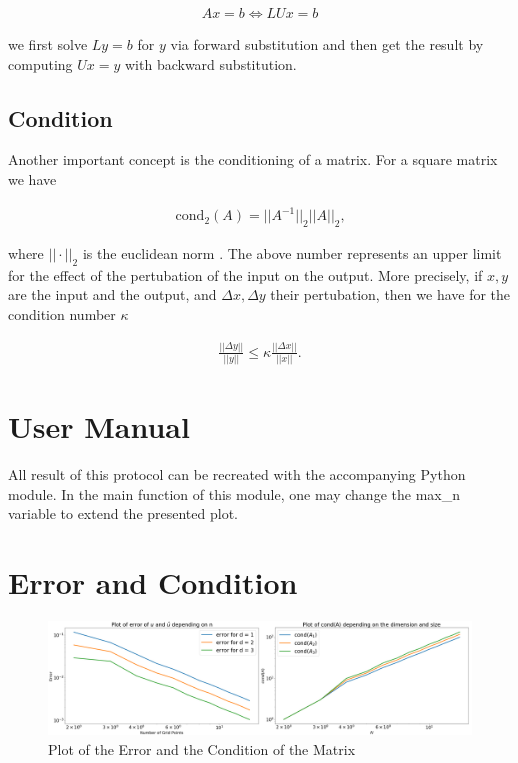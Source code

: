 \documentclass[refman]{article}
\theoremstyle{definition}
\begin{document}
\begin{align*}
	Ax = b \iff LUx = b
\end{align*}

we first solve \(Ly = b\) for \(y\) via forward substitution and then get the result by computing \(Ux = y\) with backward substitution.

\subsection{Condition}

Another important concept is the conditioning of a matrix. For a square matrix we have

\begin{align*}
	\text{cond}_2(A) = ||A^{-1}||_2 ||A||_2 \text{,}
\end{align*}

where \(|| \cdot ||_2\) is the euclidean norm \cite{nla}. The above number represents an upper limit for the effect of the pertubation of the input on the output. More precisely, if \(x, y\) are the input and the output, and \(\Delta x, \Delta y\) their pertubation, then we have for the condition number \(\kappa\)

\begin{align*}
	\frac{||\Delta y||}{||y||} \leq \kappa \frac{||\Delta x||}{||x||} \text{.}
\end{align*}

\section{User Manual}

All result of this protocol can be recreated with the accompanying Python module. In the main function of this module, one may change the max\_n variable to extend the presented plot.

\section{Error and Condition}

\begin{figure}[h]
	\includegraphics[width=\linewidth]{graphics/error_condition.png}
	\caption{Plot of the Error and the Condition of the Matrix}
	\label{fig:plot_error}
\end{figure}
\end{document}

